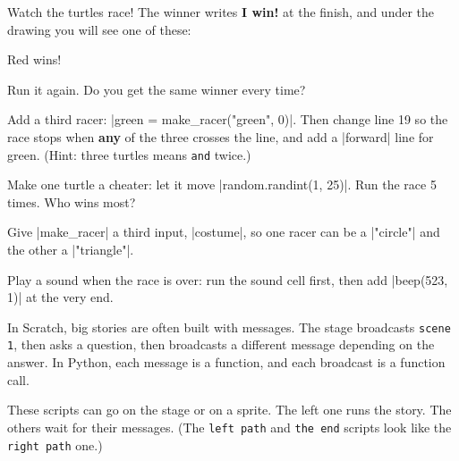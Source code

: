 Watch the turtles race! The winner writes \textbf{I win!} at the finish, and under the drawing you will see one of these:

\begin{outputbox}
Red wins!
\end{outputbox}

Run it again. Do you get the same winner every time?

\begin{challenge}
\tick Add a third racer: \py|green = make_racer("green", 0)|. Then change line 19 so the race stops when \textbf{any} of the three crosses the line, and add a \py|forward| line for green. (Hint: three turtles means \texttt{and} twice.)\par
\tick Make one turtle a cheater: let it move \py|random.randint(1, 25)|. Run the race 5 times. Who wins most?\par
\tick Give \py|make_racer| a third input, \py|costume|, so one racer can be a \py|"circle"| and the other a \py|"triangle"|.\par
\tick Play a sound when the race is over: run the sound cell first, then add \py|beep(523, 1)| at the very end.
\end{challenge}


In Scratch, big stories are often built with messages. The stage broadcasts \texttt{scene 1}, then asks a question, then broadcasts a different message depending on the answer. In Python, each message is a function, and each broadcast is a function call.

These scripts can go on the stage or on a sprite. The left one runs the story. The others wait for their messages. (The \texttt{left path} and \texttt{the end} scripts look like the \texttt{right path} one.)

